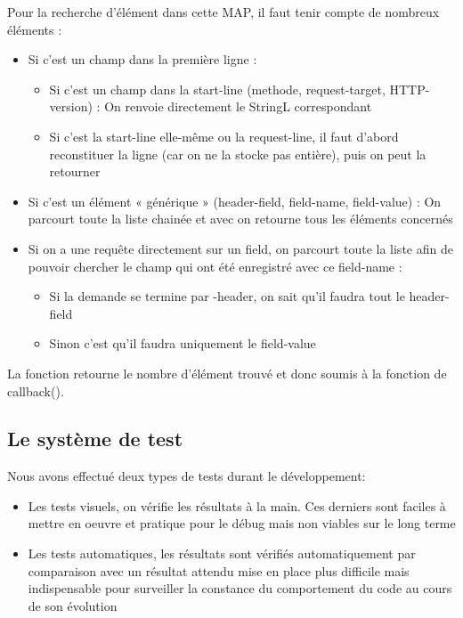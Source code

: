 \documentclass{article}
\begin{document}
                Pour la recherche d’élément dans cette MAP, il faut tenir compte de nombreux éléments :
                \begin{itemize}
                    \item Si c’est un champ dans la première ligne :
                    \begin{itemize}
                        \item Si c’est un champ dans la start-line (methode, request-target, HTTP-version) : On renvoie directement le StringL correspondant
                        \item Si c’est la start-line elle-même ou la request-line, il faut d’abord reconstituer la ligne (car on ne la stocke pas entière), puis on peut la retourner
                    \end{itemize}
                    \item Si c’est un élément « générique » (header-field, field-name, field-value) : On parcourt toute la liste chainée et avec on retourne tous les éléments concernés
                    \item Si on a une requête directement sur un field, on parcourt toute la liste afin de pouvoir chercher le champ qui ont été enregistré avec ce field-name :
                    \begin{itemize}
                        \item Si la demande se termine par -header, on sait qu’il faudra tout le header-field
                        \item Sinon c’est qu’il faudra uniquement le field-value
                    \end{itemize}
                \end{itemize}
                
                La fonction retourne le nombre d’élément trouvé et donc soumis à la fonction de callback().
                
        \subsection{Le système de test} %
        
            Nous avons effectué deux types de tests durant le développement:
            \begin{itemize}
                \item Les tests visuels, on vérifie les résultats à la main. Ces derniers sont faciles à mettre en oeuvre et pratique pour le débug mais non viables sur le long terme
                \item Les tests automatiques, les résultats sont vérifiés automatiquement par comparaison avec un résultat attendu mise en place plus difficile mais indispensable pour surveiller la constance du comportement du code au cours de son évolution
            \end{itemize}
            
\end{document}
